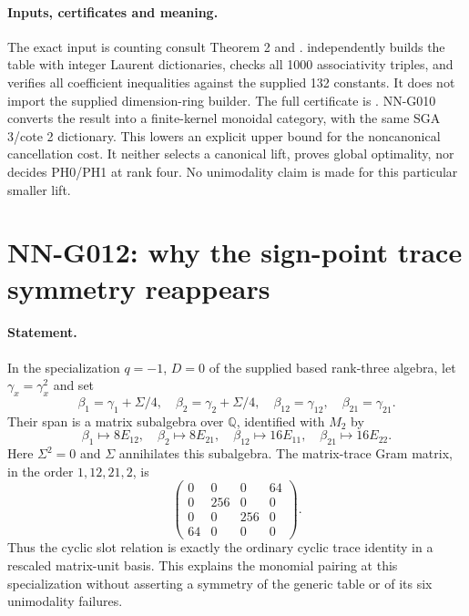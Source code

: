 \paragraph{Inputs, certificates and meaning.}
The exact input is counting consult Theorem 2 and
.
 independently builds the
table with integer Laurent dictionaries, checks all 1000
associativity triples, and verifies all coefficient inequalities
against the supplied 132 constants. It does not import the
supplied dimension-ring builder. The full certificate is
.
NN-G010 converts the result into a finite-kernel monoidal
category, with the same SGA 3/cote 2 dictionary. This lowers
an explicit upper bound for the noncanonical cancellation
cost. It neither selects a canonical lift, proves global
optimality, nor decides PH0/PH1 at rank four. No unimodality
claim is made for this particular smaller lift.



\section{NN-G012: why the sign-point trace symmetry reappears}
\paragraph{Statement.}
In the specialization $q=-1$, $D=0$ of the supplied based
rank-three algebra, let $\gamma_x=\gamma_x^2$ and set
\[
 \beta_1=\gamma_1+\Sigma/4,\quad
 \beta_2=\gamma_2+\Sigma/4,\quad
 \beta_{12}=\gamma_{12},\quad\beta_{21}=\gamma_{21}.
\]
Their span is a matrix subalgebra over $\mathbb Q$, identified
with $M_2$ by
\[
 \beta_1\mapsto8E_{12},\quad\beta_2\mapsto8E_{21},\quad
 \beta_{12}\mapsto16E_{11},\quad\beta_{21}\mapsto16E_{22}.
 \tag{G012.1}
\]
Here $\Sigma^2=0$ and $\Sigma$ annihilates this subalgebra.
The matrix-trace Gram matrix, in the order $1,12,21,2$, is
\[
 \begin{pmatrix}0&0&0&64\\0&256&0&0\\0&0&256&0\\64&0&0&0\end{pmatrix}.
 \tag{G012.2}
\]
Thus the cyclic slot relation is exactly the ordinary cyclic
trace identity in a rescaled matrix-unit basis. This explains
the monomial pairing at this specialization without asserting
a symmetry of the generic table or of its six unimodality
failures.

